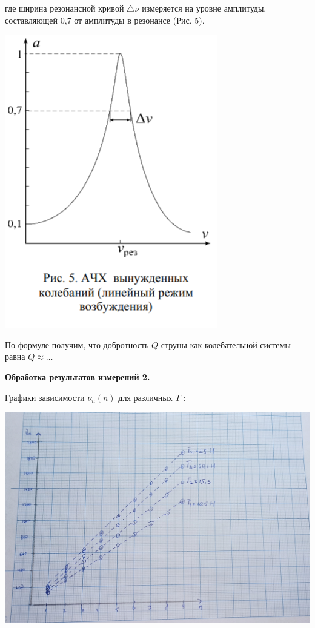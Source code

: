 \documentclass[a4paper,12pt]{article} %
\begin{document}
где ширина резонансной кривой $\bigtriangleup \nu$ измеряется на уровне амплитуды, составляющей 0,7 от амплитуды в резонансе
(Рис. 5).






\begin{center}
\includegraphics[scale=0.8]{1.4.5 6}
\end{center}

По формуле получим, что добротность $Q$ струны как колебательной системы равна $Q \approx \dots$

{\bf Обработка результатов измерений 2.}

Графики зависимости $\nu_n(n)$ для различных $T$ :

\begin{center}
\includegraphics[scale=0.17]{1.4.5 9}
\end{center}
\end{document}
